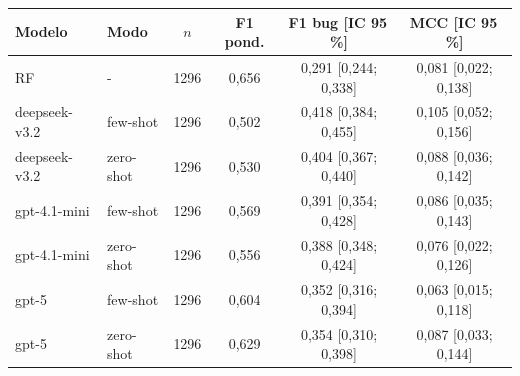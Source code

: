 \begin{tabular}{llcccc}
\toprule
Modelo & Modo & $n$ & F1 pond. & F1 bug [IC 95\,\%] & MCC [IC 95\,\%] \\
\midrule
RF & - & 1296 & 0,656 & 0,291 [0,244; 0,338] & 0,081 [0,022; 0,138] \\
deepseek-v3.2 & few-shot & 1296 & 0,502 & 0,418 [0,384; 0,455] & 0,105 [0,052; 0,156] \\
deepseek-v3.2 & zero-shot & 1296 & 0,530 & 0,404 [0,367; 0,440] & 0,088 [0,036; 0,142] \\
gpt-4.1-mini & few-shot & 1296 & 0,569 & 0,391 [0,354; 0,428] & 0,086 [0,035; 0,143] \\
gpt-4.1-mini & zero-shot & 1296 & 0,556 & 0,388 [0,348; 0,424] & 0,076 [0,022; 0,126] \\
gpt-5 & few-shot & 1296 & 0,604 & 0,352 [0,316; 0,394] & 0,063 [0,015; 0,118] \\
gpt-5 & zero-shot & 1296 & 0,629 & 0,354 [0,310; 0,398] & 0,087 [0,033; 0,144] \\
\bottomrule
\end{tabular}
